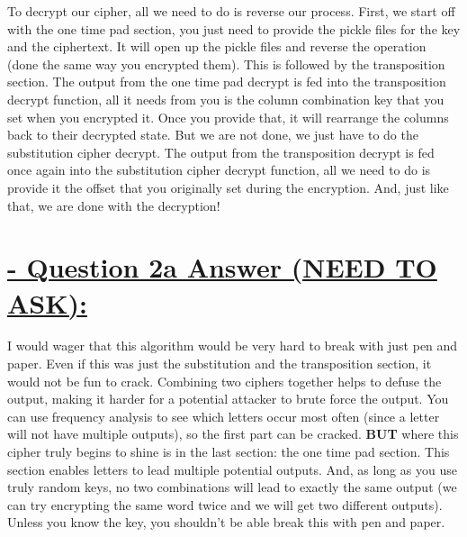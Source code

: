 \documentclass{article}
\begin{document}
\newline
To decrypt our cipher, all we need to do is reverse our process. First, we start off with the one time pad section, you just need to provide the pickle files for the key and the ciphertext. It will open up the pickle files and reverse the operation (done the same way you encrypted them). This is followed by the transposition section. The output from the one time pad decrypt is fed into the transposition decrypt function, all it needs from you is the column combination key that you set when you encrypted it. Once you provide that, it will rearrange the columns back to their decrypted state. But we are not done, we just have to do the substitution cipher decrypt. The output from the transposition decrypt is fed once again into the substitution cipher decrypt function, all we need to do is provide it the offset that you originally set during the encryption. And, just like that, we are done with the decryption!
\section{\underline{ - Question 2a Answer (NEED TO ASK):}}
I would wager that this algorithm would be very hard to break with just pen and paper. Even if this was just the substitution and the transposition section, it would not be fun to crack. Combining two ciphers together helps to defuse the output, making it harder for a potential attacker to brute force the output. You can use frequency analysis to see which letters occur most often (since a letter will not have multiple outputs), so the first part can be cracked. \newline
\textbf{BUT} where this cipher truly begins to shine is in the last section: the one time pad section. This section enables letters to lead multiple potential outputs. And, as long as you use truly random keys, no two combinations will lead to exactly the same output (we can try encrypting the same word twice and we will get two different outputs). Unless you know the key, you shouldn't be able break this with pen and paper.
\end{document}
